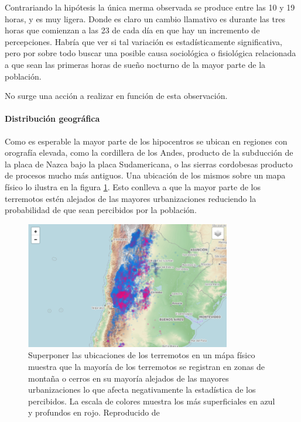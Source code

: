 \documentclass[a4paper]{report}
\begin{document}
Contrariando la hipótesis la única merma observada se produce entre las 10 y 19 horas, y es muy ligera.
Donde es claro un cambio llamativo es durante las tres horas que comienzan a las 23 de cada día en que hay un incremento de percepciones. 
Habría que ver si tal variación es estadísticamente significativa, pero por sobre todo buscar una posible causa sociológica o fisiológica relacionada a que sean las primeras horas de sueño nocturno de la mayor parte de la población.

No surge una acción a realizar en función de esta observación.


\paragraph{Distribución geográfica}
Como es esperable la mayor parte de los hipocentros se ubican en regiones con orografía elevada, como la cordillera de los Andes, producto de la subducción de la placa de Nazca bajo la placa Sudamericana, o las sierras cordobesas producto de procesos mucho más antiguos. 
Una ubicación de los mismos sobre un mapa físico lo ilustra en la figura \ref{fig:mapa_sismos}.
Esto conlleva a que la mayor parte de los terremotos estén alejados de las mayores urbanizaciones reduciendo la probabilidad de que sean percibidos por la población.
\begin{figure}[!h]
\centering
\includegraphics[width=0.8\textwidth]{mapa_sismos.png}
\caption{Superponer las ubicaciones de los terremotos en un mápa físico muestra que la mayoría de los terremotos se registran en zonas de montaña o cerros en su mayoría alejados de las mayores urbanizaciones lo que afecta negativamente la estadística de los percibidos.
La escala de colores muestra los más superficiales en azul y profundos en rojo.
Reproducido de \cite{daniela_parada_ic-datasets-docencia_nodate}}
\label{fig:mapa_sismos}
\end{figure}
\end{document}
